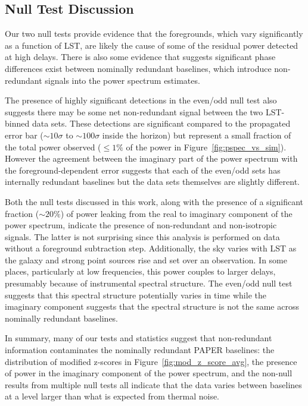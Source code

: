 \subsection{Null Test Discussion}

Our two null tests provide evidence that the foregrounds,
which vary significantly as a function of LST, are likely the cause of
some of the residual power detected at high delays. There is also some
evidence that suggests significant phase differences exist between
nominally redundant baselines, which introduce non-redundant signals
into the power spectrum estimates.

The presence of highly significant detections in the
even/odd null test also suggests
there may be some net non-redundant signal between the
two LST-binned data sets. These detections are significant
compared to the propagated error bar ($ \sim10\sigma $ to $ \sim100\sigma $ inside the horizon) but
represent a small fraction of the total power observed ($ \leq 1\% $ of the power in Figure~\ref{fig:pspec_vs_sim}).
However the agreement between the
imaginary part of the power spectrum with the
foreground-dependent error suggests that each of the even/odd sets
has internally redundant baselines but the
data sets themselves are slightly different.

Both the null tests discussed in this work, along with the
presence of a significant fraction ($ \sim20\% $)
of power leaking from the real to imaginary component of
the power spectrum, indicate the presence of
non-redundant and non-isotropic signals. The latter
is not surprising since this analysis is performed
on data without a foreground subtraction step. Additionally, the sky
varies with LST as the galaxy and strong point sources
rise and set over an observation. In some places, particularly at low frequencies, this power
couples to larger delays, presumably because of
instrumental spectral structure. The even/odd null test suggests that this
spectral structure potentially varies in time while the imaginary component
suggests that the spectral structure is not the same across nominally redundant baselines.

In summary, many of our tests and statistics suggest that non-redundant
information contaminates the nominally redundant PAPER
baselines: the distribution of modified z-scores in
Figure~\ref{fig:mod_z_score_avg}, the presence
of power in the imaginary component of the power
spectrum, and the non-null results from multiple null tests all indicate that the
data varies between baselines at a level larger
than what is expected from thermal noise.

